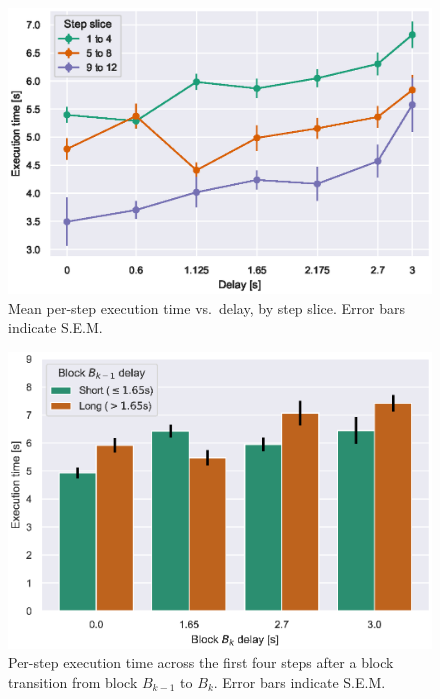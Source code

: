 \begin{figure}[h]
    \centering
    \includegraphics[width=.8\textwidth]{publications/2021ImpactDelayedResponse/Fig7.eps}
    \caption{Mean per-step execution time vs.\ delay, by step slice.
        Error bars indicate S.E.M.}
    \label{fig:exectime:delay:slice}
\end{figure}

\begin{figure}[h]
    \centering
    \includegraphics[width=.8\textwidth]{publications/2021ImpactDelayedResponse/Fig8.eps}
    \caption{Per-step execution time across the first four steps after a block transition from block \( B_{k-1} \) to \( B_k \). Error bars indicate S.E.M.}\label{fig:exectime:transition}%
\end{figure}

